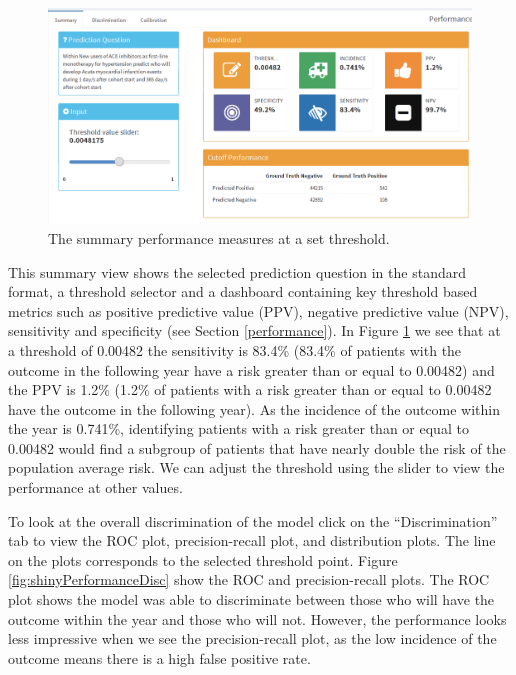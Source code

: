 \documentclass[11pt]{book}
\theoremstyle{definition}
\theoremstyle{definition}
\theoremstyle{definition}
\theoremstyle{remark}
\begin{document}
\begin{figure}

{\centering \includegraphics[width=1\linewidth]{images/PatientLevelPrediction/shiny/shinyPerformanceSum} 

}

\caption{The summary performance measures at a set threshold.}\label{fig:shinyPerformanceSum}
\end{figure}

This summary view shows the selected prediction question in the standard format, a threshold selector and a dashboard containing key threshold based metrics such as positive predictive value (PPV), negative predictive value (NPV), sensitivity and specificity (see Section \ref{performance}). In Figure \ref{fig:shinyPerformanceSum} we see that at a threshold of 0.00482 the sensitivity is 83.4\% (83.4\% of patients with the outcome in the following year have a risk greater than or equal to 0.00482) and the PPV is 1.2\% (1.2\% of patients with a risk greater than or equal to 0.00482 have the outcome in the following year). As the incidence of the outcome within the year is 0.741\%, identifying patients with a risk greater than or equal to 0.00482 would find a subgroup of patients that have nearly double the risk of the population average risk. We can adjust the threshold using the slider to view the performance at other values.

To look at the overall discrimination of the model click on the ``Discrimination'' tab to view the ROC plot, precision-recall plot, and distribution plots. The line on the plots corresponds to the selected threshold point. Figure \ref{fig:shinyPerformanceDisc} show the ROC and precision-recall plots. The ROC plot shows the model was able to discriminate between those who will have the outcome within the year and those who will not. However, the performance looks less impressive when we see the precision-recall plot, as the low incidence of the outcome means there is a high false positive rate.
\end{document}
